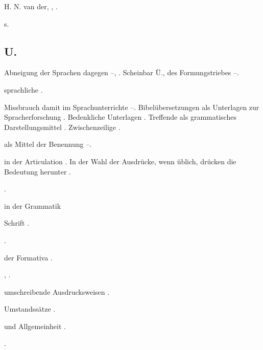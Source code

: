 \begin{register}
 H. N. van der, \pageref{sp.193}, \pageref{sp.379}.

 s. 

\subsection*{U.}\label{reg.U}

 Abneigung der Sprachen dagegen \pageref{sp.100}–\pageref{sp.101}, \pageref{sp.238}. Scheinbar Ü.,  des Formungstriebes \pageref{sp.361}–\pageref{sp.365}.

 sprachliche \pageref{sp.14}.

 Missbrauch damit im Sprachunterrichte \pageref{sp.71}–\pageref{sp.72}. Bibelübersetzungen als Unterlagen zur Spracherforschung \pageref{sp.73}. Bedenkliche Unterlagen \pageref{sp.105}. Treffende  als grammatisches Darstellungsmittel \pageref{sp.120}. Zwischenzeilige \pageref{sp.405}.

 als Mittel der Benennung \pageref{sp.40}–\pageref{sp.42}\sed{, \pageref{sp.233}}. 

 in der Articulation \pageref{sp.183}.  In der Wahl der Ausdrücke, wenn üblich, drücken die Bedeutung herunter \pageref{sp.243}.

 \pageref{sp.263}.

 in der Grammatik  

 Schrift \pageref{sp.129}.

 \pageref{sp.282}.


 der Formativa \pageref{sp.214}.

 \pageref{sp.200}, \pageref{sp.401}.

 umschreibende Ausdrucksweisen \pageref{sp.183}.

 Umstandssätze \pageref{sp.104}.

 und Allgemeinheit \pageref{sp.326}.

 \pageref{sp.122}.


\end{register}
